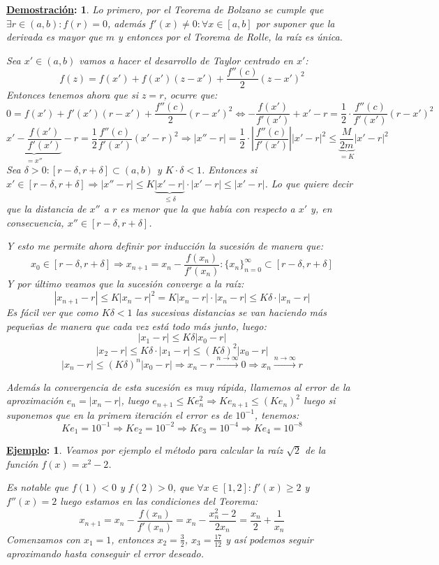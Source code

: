 \documentclass[10pt,a4paper,openright]{book}
\theoremstyle{break}
\newtheorem*{demo}{\underline{Demostración}:}
\newtheorem*{ej}{\underline{Ejemplo}:}
\begin{document}
\begin{demo}
Lo primero, por el Teorema de Bolzano se cumple que $\exists r\in (a,b): f(r)=0$, además $f'(x)\neq 0: \forall x\in [a,b]$ por suponer que la derivada es mayor que $m$ y entonces por el Teorema de Rolle, la raíz es única.

Sea $x'\in (a,b)$ vamos a hacer el desarrollo de Taylor centrado en $x'$:
$$f(z)=f(x')+f(x')(z-x')+\frac{f''(c)}{2}(z-x')^2$$
Entonces tenemos ahora que si $z=r$, ocurre que: 
$$0=f(x')+f'(x')(r-x')+\frac{f''(c)}{2}(r-x')^2\Leftrightarrow -\frac{f(x')}{f'(x')}+x'-r=\frac{1}{2}\cdot \frac{f''(c)}{f'(x')}(r-x')^2$$
$$\underbrace{x'-\frac{f(x')}{f'(x')}}_{=x''}-r =\frac{1}{2} \frac{f''(c)}{f'(x')}(x'-r)^2\Rightarrow |x''-r|=\frac{1}{2}\cdot \left|\frac{f''(c)}{f'(x')}\right||x'-r|^2\leq \underbrace{\frac{M}{2m}}_{=K}|x'-r|^2$$
Sea $\delta>0: [r-\delta, r+\delta]\subset (a,b)$ y $K\cdot \delta <1$. Entonces si $x'\in [r-\delta, r+\delta]\Rightarrow |x''-r|\leq K\underbrace{|x'-r|}_{\leq \delta}\cdot |x'-r|\leq |x'-r|$. Lo que quiere decir que la distancia de $x''$ a $r$ es menor que la que había con respecto a $x'$ y, en consecuencia, $x''\in [r-\delta, r+\delta]$.

Y esto me permite ahora definir por inducción la sucesión de manera que:
$$x_0\in [r-\delta, r+\delta]\Rightarrow x_{n+1}=x_n-\frac{f(x_n)}{f'(x_n)}: \{x_n\}_{n=0}^\infty \subset [r-\delta, r+\delta]$$
Y por último veamos que la sucesión converge a la raíz:
$$|x_{n+1}-r|\leq K|x_n-r|^2=K|x_n-r|\cdot |x_n-r|\leq K\delta \cdot |x_n-r|$$
Es fácil ver que como $K\delta<1$ las sucesivas distancias se van haciendo más pequeñas de manera que cada vez está todo más junto, luego:
$$|x_1-r|\leq K\delta |x_0-r|$$
$$|x_2-r|\leq K\delta\cdot |x_1-r|\leq (K\delta)^2 |x_0-r|$$
$$|x_n-r|\leq (K\delta)^n |x_0-r|\Rightarrow x_n-r\xrightarrow{n\rightarrow \infty}0\Rightarrow x_n\xrightarrow{n\rightarrow \infty} r$$

Además la convergencia de esta sucesión es muy rápida, llamemos al error de la aproximación $e_n=|x_n-r|$, luego $e_{n+1}\leq Ke_n^2\Rightarrow Ke_{n+1}\leq (Ke_n)^2$ luego si suponemos que en la primera iteración el error es de $10^{-1}$, tenemos:
$$Ke_1=10^{-1}\Rightarrow Ke_2=10^{-2}\Rightarrow Ke_3=10^{-4}\Rightarrow Ke_4=10^{-8}$$
\end{demo}

\begin{ej}
Veamos por ejemplo el método para calcular la raíz $\sqrt{2}$ de la función $f(x)=x^2-2$.

Es notable que $f(1)<0$ y $f(2)>0$, que $\forall x\in [1,2]: f'(x)\geq 2$ y $f''(x)=2$ luego estamos en las condiciones del Teorema:
$$x_{n+1}=x_n-\frac{f(x_n)}{f'(x_n)}=x_n-\frac{x_n^2-2}{2x_n}=\frac{x_n}{2}+\frac{1}{x_n}$$
Comenzamos con $x_1=1$, entonces $x_2=\frac{3}{2}$, $x_3=\frac{17}{12}$ y así podemos seguir aproximando hasta conseguir el error deseado.
\end{ej}
\end{document}
